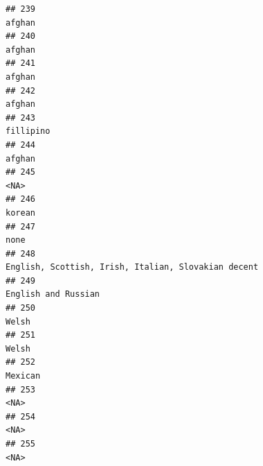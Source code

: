 \documentclass[]{article}
\begin{document}
\begin{verbatim}
## 239                                                                                                                                              afghan
## 240                                                                                                                                              afghan
## 241                                                                                                                                              afghan
## 242                                                                                                                                              afghan
## 243                                                                                                                                           fillipino
## 244                                                                                                                                              afghan
## 245                                                                                                                                                <NA>
## 246                                                                                                                                              korean
## 247                                                                                                                                                none
## 248                                                                                                 English, Scottish, Irish, Italian, Slovakian decent
## 249                                                                                                                                 English and Russian
## 250                                                                                                                                               Welsh
## 251                                                                                                                                               Welsh
## 252                                                                                                                                             Mexican
## 253                                                                                                                                                <NA>
## 254                                                                                                                                                <NA>
## 255                                                                                                                                                <NA>

\end{verbatim}
\end{document}
